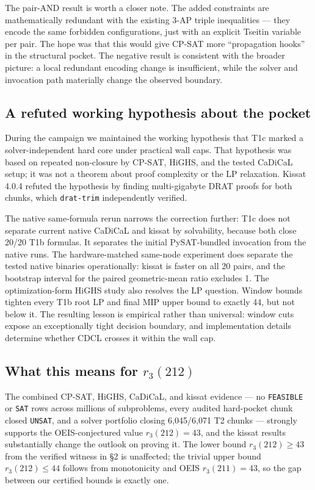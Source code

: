 The pair-AND result is worth a closer note. The added constraints are
mathematically redundant with the existing 3-AP triple inequalities --- they
encode the same forbidden configurations, just with an explicit Tseitin
variable per pair. The hope was that this would give CP-SAT more
``propagation hooks'' in the structural pocket. The negative result is
consistent with the broader picture: a local redundant encoding change is
insufficient, while the solver and invocation path materially change the
observed boundary.

\subsection{A refuted working hypothesis about the pocket}\label{a-refuted-hypothesis-about-the-pocket}

During the campaign we maintained the working hypothesis that T1c marked a
solver-independent hard core under practical wall caps. That hypothesis was
based on repeated non-closure by CP-SAT, HiGHS, and the tested CaDiCaL setup;
it was not a theorem about proof complexity or the LP relaxation. Kissat
4.0.4 refuted the hypothesis by finding multi-gigabyte DRAT proofs for both
chunks, which \texttt{drat-trim} independently verified.

The native same-formula rerun narrows the correction further: T1c does not
separate current native CaDiCaL and kissat by solvability, because both close
20/20 T1b formulas. It separates the initial PySAT-bundled invocation from
the native runs. The hardware-matched same-node experiment does separate the
tested native binaries operationally: kissat is faster on all 20 pairs, and
the bootstrap interval for the paired geometric-mean ratio excludes 1. The
optimization-form HiGHS study
also resolves the LP question. Window bounds tighten every T1b root LP and
final MIP upper bound to exactly 44, but not below it. The resulting lesson
is empirical rather than universal: window cuts expose an exceptionally
tight decision boundary, and implementation details determine whether CDCL
crosses it within the wall cap.

\subsection{\texorpdfstring{What this means for $r_3(212)$}{What this means for r\_3(212)}}\label{what-this-means-for-r_3212}

The combined CP-SAT, HiGHS, CaDiCaL, and kissat evidence --- no
\texttt{FEASIBLE} or \texttt{SAT} rows across millions of subproblems, every
audited hard-pocket chunk closed \texttt{UNSAT}, and a solver portfolio
closing 6,045/6,071 T2 chunks --- strongly supports the
OEIS-conjectured value $r_3(212) = 43$, and the kissat results
substantially change the outlook on proving it. The lower bound
$r_3(212) \geq 43$ from the verified witness in §2 is unaffected; the trivial
upper bound $r_3(212) \leq 44$ follows from monotonicity and OEIS
$r_3(211) = 43$, so the gap between our certified bounds is exactly one.

